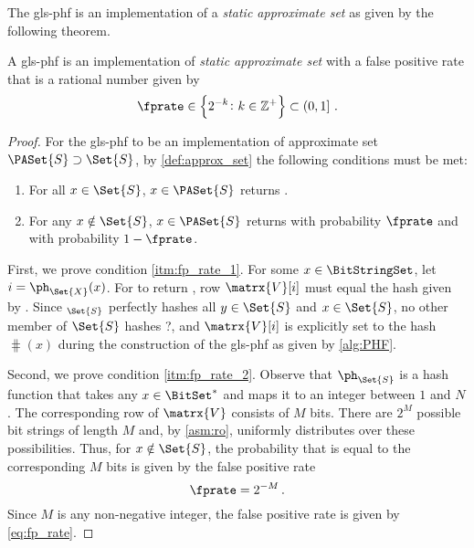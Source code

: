 \documentclass[ ../main.tex]{subfiles}
\begin{document}
The \gls{gls-phf} is an implementation of a \emph{static approximate set} as given by the following theorem.
\begin{theorem}
\label{thm:fp_rate}
A \gls{gls-phf} is an implementation of \emph{static approximate set} with a false positive rate that is a rational number given by
\begin{equation}
\label{eq:fp_rate}
    \fprate \in \left\{ 2^{-k} \colon k \in \mathbb{Z}^+\right\} \subset \left(0, 1\right]\,.
\end{equation}
\end{theorem}
\begin{proof}
For the \gls{gls-phf} to be an implementation of approximate set $\PASet{S} \supset \Set{S}$, by \cref{def:approx_set} the following conditions must be met:
\begin{enumerate}
\item\label{itm:fp_rate_1} For all $x \in \Set{S}$, $x \in \PASet{S}$ returns \True.
\item\label{itm:fp_rate_2} For any $x \notin \Set{S}$, $x \in \PASet{S}$ returns \True with probability $\fprate$ and \False with probability $1 - \fprate$.
\end{enumerate}

First, we prove condition \ref{itm:fp_rate_1}. For some $x \in \BitStringSet$,
let $i = \ph_{\Set{X}}(x)$. For  to return \True, row $\matrx{V}[i]$ must equal the hash given by . Since \ph$_{\Set{S}}$ perfectly hashes all $y \in \Set{S}$ and $x \in \Set{S}$, no other member of $\Set{S}$ hashes ?, and $\matrx{V}[i]$ is explicitly set to the hash $\hash(x)$ during the construction of the \gls{gls-phf} as given by \cref{alg:PHF}.

Second, we prove condition \ref{itm:fp_rate_2}. Observe that $\ph_{\Set{S}}$ is a hash function that takes any $x \in \BitSet^*$ and maps it to an integer between $1$ and $N$. The corresponding row of $\matrx{V}$ consists of $M$ bits. There are $2^M$ possible bit strings of length $M$ and, by \cref{asm:ro}, \hash uniformly distributes over these possibilities. Thus, for $x \notin \Set{S}$, the probability that  is equal to the corresponding $M$ bits is given by the false positive rate
\begin{equation}
\fprate = 2^{-M}\,.
\end{equation}
Since $M$ is any non-negative integer, the false positive rate is given by \cref{eq:fp_rate}.
\end{proof}
\end{document}
